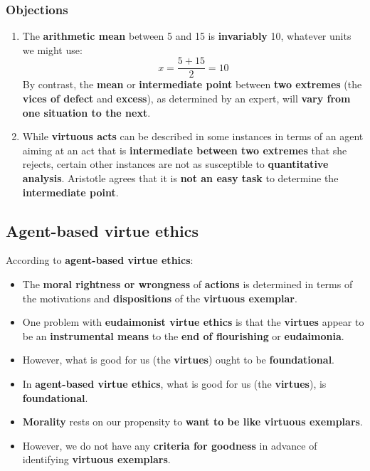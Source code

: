 \documentclass[11pt]{article}
\begin{document}
\subsubsection{Objections}
\label{sec:org4cd850b}
\begin{enumerate}
\item The \textbf{arithmetic mean} between 5 and 15 is \textbf{invariably} 10, whatever units we might use:
\[x = \frac{5 + 15}{2} = 10\]
By contrast, the \textbf{mean} or \textbf{intermediate point} between \textbf{two extremes} (the \textbf{vices of defect} and \textbf{excess}), as determined by an expert, will \textbf{vary from one situation to the next}.
\item While \textbf{virtuous acts} can be described in some instances in terms of an agent aiming at an act that is \textbf{intermediate between two extremes} that she rejects, certain other instances are not as susceptible to \textbf{quantitative analysis}. Aristotle agrees that it is \textbf{not an easy task} to determine the \textbf{intermediate point}.
\end{enumerate}
\subsection{Agent-based virtue ethics}
\label{sec:org2df4ec5}
According to \textbf{agent-based virtue ethics}:
\begin{itemize}
\item The \textbf{moral rightness or wrongness} of \textbf{actions} is determined in terms of the motivations and \textbf{dispositions} of the \textbf{virtuous exemplar}.
\item One problem with \textbf{eudaimonist virtue ethics} is that the \textbf{virtues} appear to be an \textbf{instrumental means} to the \textbf{end of flourishing} or \textbf{eudaimonia}.
\item However, what is good for us (the \textbf{virtues}) ought to be \textbf{foundational}.
\item In \textbf{agent-based virtue ethics}, what is good for us (the \textbf{virtues}), is \textbf{foundational}.
\item \textbf{Morality} rests on our propensity to \textbf{want to be like virtuous exemplars}.
\item However, we do not have any \textbf{criteria for goodness} in advance of identifying \textbf{virtuous exemplars}.
\end{itemize}

 \newpage
\end{document}

